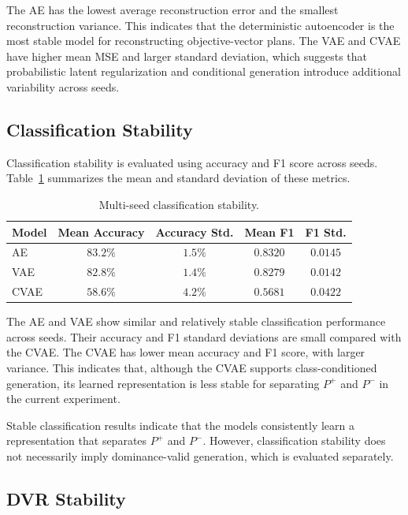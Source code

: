 The AE has the lowest average reconstruction error and the smallest reconstruction variance. This indicates that the deterministic autoencoder is the most stable model for reconstructing objective-vector plans. The VAE and CVAE have higher mean MSE and larger standard deviation, which suggests that probabilistic latent regularization and conditional generation introduce additional variability across seeds.

\subsection{Classification Stability}
\label{subsec:classification_stability}

Classification stability is evaluated using accuracy and F1 score across seeds. Table~\ref{tab:classification_multiseed} summarizes the mean and standard deviation of these metrics.

\begin{table}[H]
\centering
\caption{Multi-seed classification stability.}
\label{tab:classification_multiseed}
\begin{tabular}{|l|c|c|c|c|}
\hline
\textbf{Model} & \textbf{Mean Accuracy} & \textbf{Accuracy Std.} & \textbf{Mean F1} & \textbf{F1 Std.} \\
\hline
AE & $83.2\%$ & $1.5\%$ & $0.8320$ & $0.0145$ \\
VAE & $82.8\%$ & $1.4\%$ & $0.8279$ & $0.0142$ \\
CVAE & $58.6\%$ & $4.2\%$ & $0.5681$ & $0.0422$ \\
\hline
\end{tabular}
\end{table}

The AE and VAE show similar and relatively stable classification performance across seeds. Their accuracy and F1 standard deviations are small compared with the CVAE. The CVAE has lower mean accuracy and F1 score, with larger variance. This indicates that, although the CVAE supports class-conditioned generation, its learned representation is less stable for separating $P^{+}$ and $P^{-}$ in the current experiment.

Stable classification results indicate that the models consistently learn a representation that separates $P^{+}$ and $P^{-}$. However, classification stability does not necessarily imply dominance-valid generation, which is evaluated separately.

\subsection{DVR Stability}
\label{subsec:dvr_stability}

